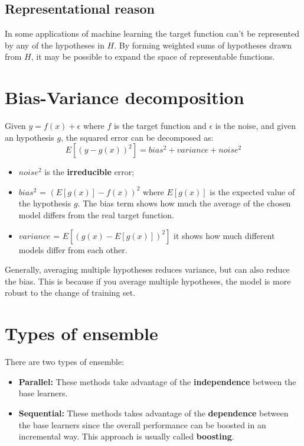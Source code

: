 \subsection{Representational reason}
In some applications of machine learning the target function can't be represented by any of the hypotheses in $H$. By forming weighted sums of hypotheses drawn from $H$, it may be possible to expand the space of representable functions.

\section{Bias-Variance decomposition}
Given $y=f(x)+\epsilon$ where $f$ is the target function and $\epsilon$ is the noise, and given an hypothesis $g$, the squared error can be decomposed as:
\[E[(y - g(x))^{2}] = bias^{2} + variance + noise^{2}\]
\begin{itemize}
    \item $noise^{2}$ is the \textbf{irreducible} error;
    \item $bias^{2}$ = $(E[g(x)] - f(x))^{2}$ where $E[g(x)]$ is the expected value of the hypothesis $g$. The bias term shows how much the average of the chosen model differs from the real target function.
    \item $variance$ = $E[(g(x) - E[g(x)])^{2}]$ it shows how much different models differ from each other.
\end{itemize}
Generally, averaging multiple hypotheses reduces variance, but can also reduce the bias. This is because if you average multiple hypotheses, the model is more robust to the change of training set.

\section{Types of ensemble}
There are two types of ensemble:
\begin{itemize}
    \item \textbf{Parallel:} These methods take advantage of the \textbf{independence} between the base learners.
    \item \textbf{Sequential:} These methods takes advantage of the \textbf{dependence} between the base learners since the overall performance can be boosted in an incremental way. This approach is usually called \textbf{boosting}.
\end{itemize}
